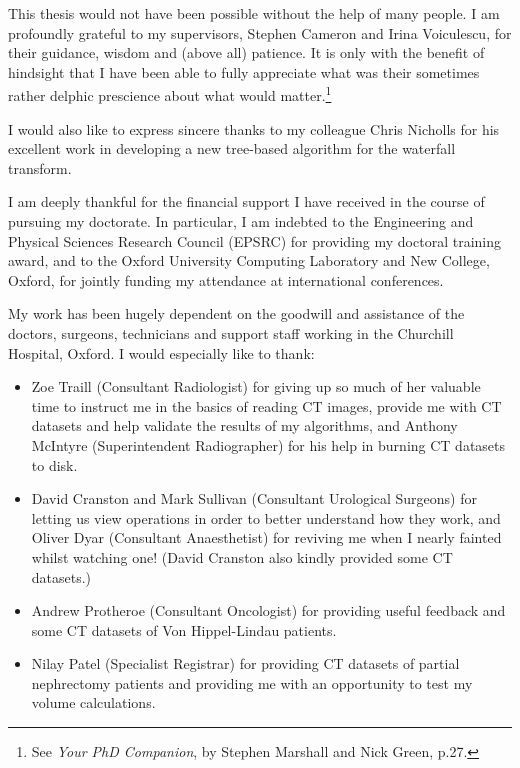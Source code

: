 \begin{acknowledgements}
This thesis would not have been possible without the help of many people. I am profoundly grateful to my supervisors, Stephen Cameron and Irina Voiculescu, for their guidance, wisdom and (above all) patience. It is only with the benefit of hindsight that I have been able to fully appreciate what was their sometimes rather delphic prescience about what would matter.\footnote{See \emph{Your PhD Companion}, by Stephen Marshall and Nick Green, p.27.}

I would also like to express sincere thanks to my colleague Chris Nicholls for his excellent work in developing a new tree-based algorithm for the waterfall transform.

I am deeply thankful for the financial support I have received in the course of pursuing my doctorate. In particular, I am indebted to the Engineering and Physical Sciences Research Council (EPSRC) for providing my doctoral training award, and to the Oxford University Computing Laboratory and New College, Oxford, for jointly funding my attendance at international conferences.

My work has been hugely dependent on the goodwill and assistance of the doctors, surgeons, technicians and support staff working in the Churchill Hospital, Oxford. I would especially like to thank:
%
\begin{itemize}

\item Zoe Traill (Consultant Radiologist) for giving up so much of her valuable time to instruct me in the basics of reading CT images, provide me with CT datasets and help validate the results of my algorithms, and Anthony McIntyre (Superintendent Radiographer) for his help in burning CT datasets to disk.

\item David Cranston and Mark Sullivan (Consultant Urological Surgeons) for letting us view operations in order to better understand how they work, and Oliver Dyar (Consultant Anaesthetist) for reviving me when I nearly fainted whilst watching one! (David Cranston also kindly provided some CT datasets.)

\item Andrew Protheroe (Consultant Oncologist) for providing useful feedback and some CT datasets of Von Hippel-Lindau patients.

\item Nilay Patel (Specialist Registrar) for providing CT datasets of partial nephrectomy patients and providing me with an opportunity to test my volume calculations.


\end{itemize}
\end{acknowledgements}
